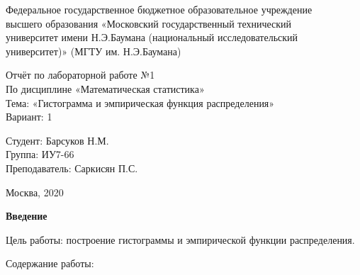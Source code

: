 \documentclass[12pt,a4paper]{scrartcl}
\begin{document}
\begin{titlepage}
\newpage
\begin{center}
Федеральное государственное бюджетное образовательное учреждение  \\
\vspace{0.25cm}%
высшего образования «Московский государственный технический  \\
\vspace{0.25cm}%
университет имени Н.Э.Баумана (национальный исследовательский \\
\vspace{0.25cm}%
университет)» (МГТУ им. Н.Э.Баумана) \\
\end{center}
\vspace{5cm}
\begin{center}
\Large Отчёт по лабораторной работе №1 \\ По дисциплине «Математическая статистика» \\ Тема: «Гистограмма и эмпирическая функция распределения» \\ Вариант: 1 %
\end{center}
\vspace{6em}
\begin{flushright}
Студент: \hrulefill Барсуков Н.М. \\
\vspace{1.5em}
Группа: \hrulefill ИУ7-66\\
\vspace{1.5em}
Преподаватель: \hrulefill Саркисян П.С.\\
\vspace{1.5em}
\end{flushright}
\vspace{\fill}
\begin{center}
Москва, 2020
\end{center}
\end{titlepage}
\newpage
\tableofcontents
{}
\newpage
\begin{center}
\textbf {Введение}
\end{center}

Цель работы: построение гистограммы и эмпирической функции распределения.

Содержание работы:
\end{document}

